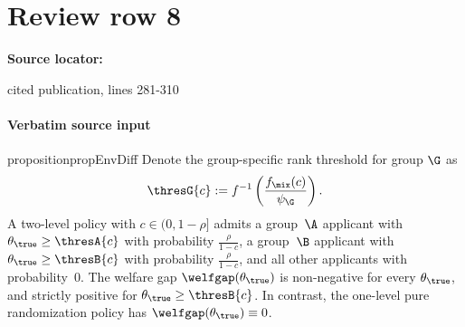 \documentclass[10pt]{article}
\begin{document}
\section*{Review row 8}
\textbf{Source locator:} {\footnotesize\raggedright cited publication, lines 281-\allowbreak{}310\par}
\paragraph{Verbatim source input}
\begin{ReviewVerbatim}
\begin{restatable}{proposition}{propEnvDiff}\label{prop:environment-diff}
	Denote the group-specific rank threshold for group $\G$ as
	\begin{equation*}
	\thresG{c} := f^{-1}\left(\frac{f_\mix(c)}{\psi_\G}\right).
	\end{equation*}
A two-level policy with $c \in (0,1-\rho]$ admits a group~$\A$ applicant with $\theta_\true \geq \thresA{c} $ with probability $\frac{\rho}{1-c}$, a group~$\B$ applicant with $\theta_\true \geq \thresB{c} $ with probability $\frac{\rho}{1-c}$, and all other applicants with probability~0. %
The welfare gap $\welfgap(\theta_\true)$ is non-negative for every $\theta_\true$, and strictly positive for $\theta_\true \geq \thresB{c}$. In contrast, the one-level pure randomization policy has $\welfgap(\theta_\true) \equiv 0$.



\end{restatable}
\end{ReviewVerbatim}
\end{document}

